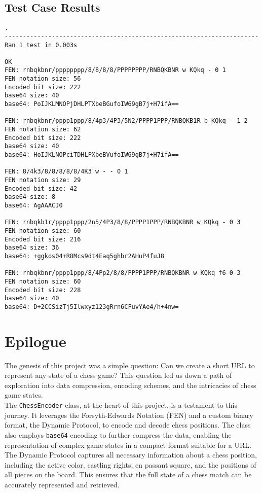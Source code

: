 \documentclass{article}
\begin{document}
\subsection{Test Case Results}
\begin{verbatim}
.
----------------------------------------------------------------------
Ran 1 test in 0.003s

OK
FEN: rnbqkbnr/pppppppp/8/8/8/8/PPPPPPPP/RNBQKBNR w KQkq - 0 1
FEN notation size: 56
Encoded bit size: 222
base64 size: 40
base64: PoIJKLMNOPjDHLPTXbeBGufoIW69gB7j+H7ifA==

FEN: rnbqkbnr/pppp1ppp/8/4p3/4P3/5N2/PPPP1PPP/RNBQKB1R b KQkq - 1 2
FEN notation size: 62
Encoded bit size: 222
base64 size: 40
base64: HoIJKLNOPciTDHLPXbeBVufoIW69gB7j+H7ifA==

FEN: 8/4k3/8/8/8/8/8/4K3 w - - 0 1
FEN notation size: 29
Encoded bit size: 42
base64 size: 8
base64: AgAAACJ0

FEN: rnbqkb1r/pppp1ppp/2n5/4P3/8/8/PPPP1PPP/RNBQKBNR w KQkq - 0 3
FEN notation size: 60
Encoded bit size: 216
base64 size: 36
base64: +ggkos04+R8Mcs9dt4Eaq5ghbr2AHuP4fuJ8

FEN: rnbqkbnr/pppp1ppp/8/4Pp2/8/8/PPPP1PPP/RNBQKBNR w KQkq f6 0 3
FEN notation size: 60
Encoded bit size: 228
base64 size: 40
base64: D+2CCSizTj5Ilwxyz123gRrn6CFuvYAe4/h+4nw=

\end{verbatim}  

\newpage

\section{Epilogue}

The genesis of this project was a simple question: Can we create a short URL to represent any state of a chess game? This question led us down a path of exploration into data compression, encoding schemes, and the intricacies of chess game states. \\

The \verb|ChessEncoder| class, at the heart of this project, is a testament to this journey. It leverages the Forsyth-Edwards Notation (FEN) and a custom binary format, the Dynamic Protocol, to encode and decode chess positions. The class also employs \verb|base64| encoding to further compress the data, enabling the representation of complex game states in a compact format suitable for a URL. \\

The Dynamic Protocol captures all necessary information about a chess position, including the active color, castling rights, en passant square, and the positions of all pieces on the board. This ensures that the full state of a chess match can be accurately represented and retrieved.
\end{document}
